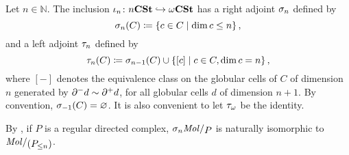 \begin{dfn} 
    Let \( n \in \mathbb{N} \).
    The inclusion \( \iota_n \colon {n\mathbf{CSt}} \hookrightarrow \omega\mathbf{CSt} \) has a right adjoint \( \sigma_{n} \) defined by
    \begin{equation*}
        \sigma_{n}(C) \coloneqq \left\{ {c \in C \mid \dim c \le n} \right\},
    \end{equation*}
    and a left adjoint \( \tau_{n} \) defined by
    \begin{equation*}
        \tau_{n}(C) \coloneqq \sigma_{n - 1}(C) \cup \left\{ {[c] \mid c \in C, \dim c = n} \right\},
    \end{equation*}
    where \( [-] \) denotes the equivalence class on the globular cells of \( C \) of dimension \( n \) generated by \( \partial_{}^{-} d \sim \partial_{}^{+} d \), for all globular cells \( d \) of dimension \( n + 1 \). 
    By convention, \( \sigma_{-1}(C) = \varnothing \).
    It is also convenient to let \( \tau_{\omega} \) be the identity.
\end{dfn}

\begin{rmk}
    By \cite[Proposition 5.2.14]{hadzihasanovic2024combinatorics}, if \( P \) is a regular directed complex, \( \skel{n} \molecin{P} \) is naturally isomorphic to \( \molecin{(\gr{\le n}P)} \).
\end{rmk}

